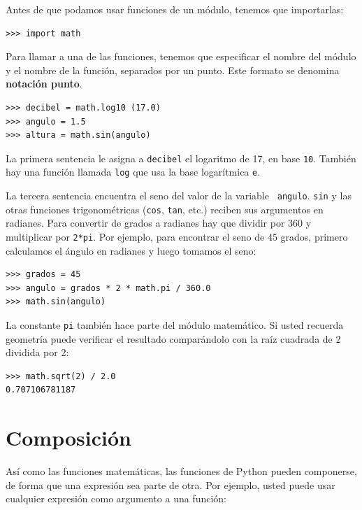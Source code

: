 
Antes de que podamos usar funciones de un módulo, tenemos que importarlas:

\beforeverb
\begin{verbatim}
>>> import math
\end{verbatim}
\afterverb
%
Para llamar a una de las funciones, tenemos que especificar el nombre
del módulo y el nombre de la función, separados por un punto. Este 
formato se denomina {\bf notación punto}.


\beforeverb
\begin{verbatim}
>>> decibel = math.log10 (17.0)
>>> angulo = 1.5
>>> altura = math.sin(angulo)
\end{verbatim}
\afterverb
%
La primera sentencia le asigna a  \texttt{decibel} el logaritmo de 17, en base
\texttt{10}.  También hay una función llamada \texttt{log} que usa la 
base logarítmica \texttt{e}. 

La tercera sentencia encuentra el seno del valor  de la  variable {\tt
angulo}.  \texttt{sin} y las otras funciones  trigonométricas (\texttt{cos},
\texttt{tan}, etc.)  reciben sus argumentos en radianes. Para convertir
de grados a radianes hay que dividir por 360 y multiplicar por \texttt{2*pi}.  
Por ejemplo, para encontrar el seno de 45 grados, primero calculamos
el ángulo en radianes y luego tomamos el seno:

\beforeverb
\begin{verbatim}
>>> grados = 45
>>> angulo = grados * 2 * math.pi / 360.0
>>> math.sin(angulo)
\end{verbatim}
\afterverb
%
La constante \texttt{pi} también hace parte del módulo matemático. Si usted
recuerda geometría puede verificar el resultado comparándolo con la
raíz cuadrada de 2 dividida por 2:

\beforeverb
\begin{verbatim}
>>> math.sqrt(2) / 2.0
0.707106781187
\end{verbatim}
\afterverb
%

\section{Composición}

Así como las funciones matemáticas, las funciones de Python pueden
componerse, de forma que una expresión sea parte de otra. Por ejemplo, usted
puede usar cualquier expresión como argumento a una función:

